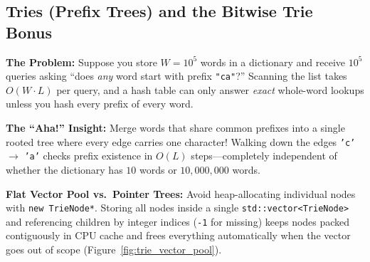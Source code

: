 \documentclass[11pt,a4paper]{article}
\theoremstyle{definition}
\newcommand{\painbeat}{\textbf{\color{accentamber}The Problem:} }
\newcommand{\ahabeat}{\textbf{\color{accentteal}The ``Aha!'' Insight:} }
\begin{document}
\subsection{Tries (Prefix Trees) and the Bitwise Trie Bonus}

\painbeat Suppose you store $W = 10^5$ words in a dictionary and receive $10^5$ queries asking ``does \emph{any} word start with prefix \texttt{"ca"}?'' Scanning the list takes $O(W \cdot L)$ per query, and a hash table can only answer \emph{exact} whole-word lookups unless you hash every prefix of every word.

\ahabeat Merge words that share common prefixes into a single rooted tree where every edge carries one character! Walking down the edges \texttt{'c'} $\to$ \texttt{'a'} checks prefix existence in $O(L)$ steps---completely independent of whether the dictionary has $10$ words or $10{,}000{,}000$ words.

\textbf{Flat Vector Pool vs.\ Pointer Trees:} Avoid heap-allocating individual nodes with \texttt{new TrieNode*}. Storing all nodes inside a single \texttt{std::vector<TrieNode>} and referencing children by integer indices (\texttt{-1} for missing) keeps nodes packed contiguously in CPU cache and frees everything automatically when the vector goes out of scope (Figure~\ref{fig:trie_vector_pool}).
\end{document}
